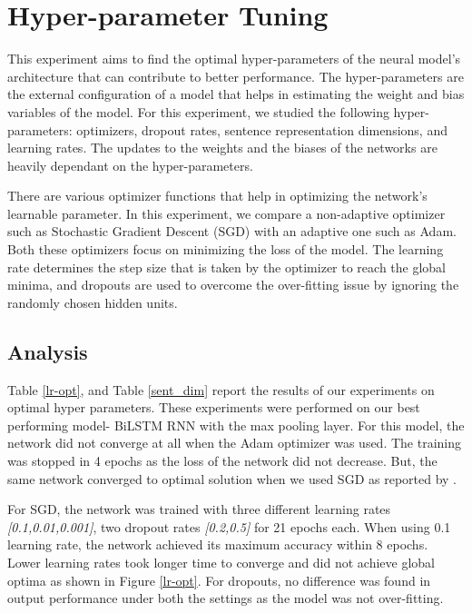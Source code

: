 \documentclass[12pt]{report} %
\begin{document}
\section{Hyper-parameter Tuning}
\label{parameter-tune}

This experiment aims to find the optimal hyper-parameters of the neural model's architecture that can contribute to better performance. The hyper-parameters are the external configuration of a model that helps in estimating the weight and bias variables of the model. For this experiment, we studied the following hyper-parameters: optimizers, dropout rates, sentence representation dimensions, and learning rates. The updates to the  weights and the biases of the networks are heavily dependant on the hyper-parameters.

There are various optimizer functions that help in optimizing the network's learnable parameter. In this experiment, we compare a non-adaptive optimizer such as Stochastic Gradient Descent (SGD) with an adaptive one such as Adam. Both these optimizers focus on minimizing the loss of the model. The learning rate determines the step size that is taken by the optimizer to reach the global minima, and dropouts are used to overcome the over-fitting issue by ignoring the randomly chosen hidden units.

\subsection{Analysis}

Table \ref{lr-opt}, and Table \ref{sent_dim} report the results of our experiments on optimal hyper parameters. These experiments were performed on our best performing model- BiLSTM RNN with the max pooling layer. For this model, the network did not converge at all when the Adam optimizer was used. The training was stopped in 4 epochs as the loss of the network did not decrease.  But, the same network converged to optimal solution when we used SGD as reported by \cite{conneau2017supervised}. 

For SGD, the network was trained with three different learning rates \textit{[0.1,0.01,0.001]}, two dropout rates \textit{[0.2,0.5]} for 21 epochs each. When using 0.1 learning rate,  the network achieved its maximum accuracy within 8 epochs. Lower learning rates took longer time to converge and did not achieve global optima as shown in Figure \ref{lr-opt}. For dropouts, no difference was found in output performance under both the settings as the model was not over-fitting.
\end{document}
